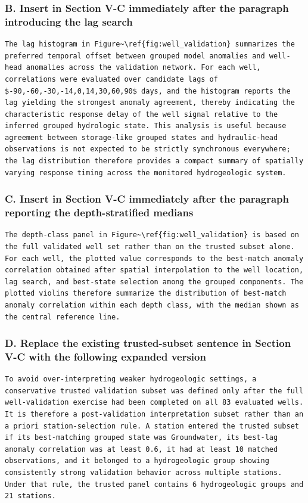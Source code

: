 \subsubsection*{B. Insert in Section V-C immediately after the paragraph introducing the lag search}

\begin{verbatim}
The lag histogram in Figure~\ref{fig:well_validation} summarizes the preferred temporal offset between grouped model anomalies and well-head anomalies across the validation network. For each well, correlations were evaluated over candidate lags of $-90,-60,-30,-14,0,14,30,60,90$ days, and the histogram reports the lag yielding the strongest anomaly agreement, thereby indicating the characteristic response delay of the well signal relative to the inferred grouped hydrologic state. This analysis is useful because agreement between storage-like grouped states and hydraulic-head observations is not expected to be strictly synchronous everywhere; the lag distribution therefore provides a compact summary of spatially varying response timing across the monitored hydrogeologic system.
\end{verbatim}

\subsubsection*{C. Insert in Section V-C immediately after the paragraph reporting the depth-stratified medians}

\begin{verbatim}
The depth-class panel in Figure~\ref{fig:well_validation} is based on the full validated well set rather than on the trusted subset alone. For each well, the plotted value corresponds to the best-match anomaly correlation obtained after spatial interpolation to the well location, lag search, and best-state selection among the grouped components. The plotted violins therefore summarize the distribution of best-match anomaly correlation within each depth class, with the median shown as the central reference line.
\end{verbatim}

\subsubsection*{D. Replace the existing trusted-subset sentence in Section V-C with the following expanded version}

\begin{verbatim}
To avoid over-interpreting weaker hydrogeologic settings, a conservative trusted validation subset was defined only after the full well-validation exercise had been completed on all 83 evaluated wells. It is therefore a post-validation interpretation subset rather than an a priori station-selection rule. A station entered the trusted subset if its best-matching grouped state was Groundwater, its best-lag anomaly correlation was at least 0.6, it had at least 10 matched observations, and it belonged to a hydrogeologic group showing consistently strong validation behavior across multiple stations. Under that rule, the trusted panel contains 6 hydrogeologic groups and 21 stations.
\end{verbatim}

